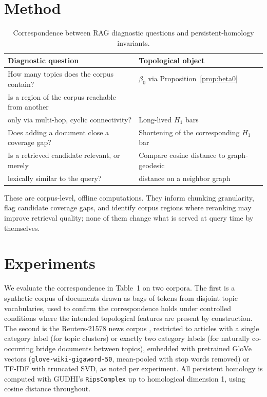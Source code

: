 \documentclass[11pt]{article}
\begin{document}
\section{Method}
\label{sec:method}

\begin{table}[h]
\centering
\begin{tabular}{ll}
\toprule
Diagnostic question & Topological object \\
\midrule
How many topics does the corpus contain? & $\beta_0$ via Proposition~\ref{prop:beta0} \\
Is a region of the corpus reachable from another & \\
\quad only via multi-hop, cyclic connectivity? & Long-lived $H_1$ bars \\
Does adding a document close a coverage gap? & Shortening of the corresponding $H_1$ bar \\
Is a retrieved candidate relevant, or merely & Compare cosine distance to graph-geodesic \\
\quad lexically similar to the query? & distance on a neighbor graph \\
\bottomrule
\end{tabular}
\caption{Correspondence between RAG diagnostic questions and persistent-homology invariants.}
\end{table}

These are corpus-level, offline computations. They inform chunking granularity, flag candidate coverage gaps, and identify corpus regions where reranking may improve retrieval quality; none of them change what is served at query time by themselves.

\section{Experiments}
\label{sec:experiments}

We evaluate the correspondence in Table~1 on two corpora. The first is a synthetic corpus of documents drawn as bags of tokens from disjoint topic vocabularies, used to confirm the correspondence holds under controlled conditions where the intended topological features are present by construction. The second is the Reuters-21578 news corpus \citep{lewis1997reuters}, restricted to articles with a single category label (for topic clusters) or exactly two category labels (for naturally co-occurring bridge documents between topics), embedded with pretrained GloVe vectors (\texttt{glove-wiki-gigaword-50}, mean-pooled with stop words removed) or TF-IDF with truncated SVD, as noted per experiment. All persistent homology is computed with GUDHI's \texttt{RipsComplex} \citep{gudhi2014} up to homological dimension 1, using cosine distance throughout.
\end{document}
